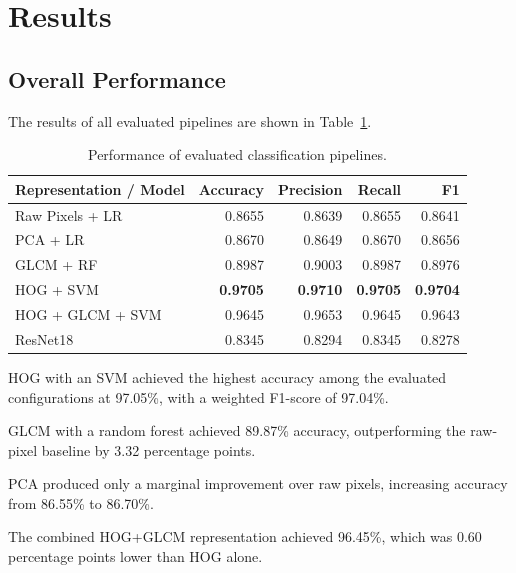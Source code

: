 \documentclass[11pt,a4paper]{article}
\begin{document}

\section{Results}

\subsection{Overall Performance}

The results of all evaluated pipelines are shown in Table~\ref{tab:results}.

\begin{table}[H]
\centering
\caption{Performance of evaluated classification pipelines.}
\label{tab:results}
\begin{tabular}{lrrrr}
\toprule
\textbf{Representation / Model}
& \textbf{Accuracy}
& \textbf{Precision}
& \textbf{Recall}
& \textbf{F1} \\
\midrule
Raw Pixels + LR
& 0.8655
& 0.8639
& 0.8655
& 0.8641 \\

PCA + LR
& 0.8670
& 0.8649
& 0.8670
& 0.8656 \\

GLCM + RF
& 0.8987
& 0.9003
& 0.8987
& 0.8976 \\

HOG + SVM
& \textbf{0.9705}
& \textbf{0.9710}
& \textbf{0.9705}
& \textbf{0.9704} \\

HOG + GLCM + SVM
& 0.9645
& 0.9653
& 0.9645
& 0.9643 \\

ResNet18
& 0.8345
& 0.8294
& 0.8345
& 0.8278 \\

\bottomrule
\end{tabular}
\end{table}

HOG with an SVM achieved the highest accuracy among the evaluated configurations at 97.05\%, with a weighted F1-score of 97.04\%.

GLCM with a random forest achieved 89.87\% accuracy, outperforming the raw-pixel baseline by 3.32 percentage points.

PCA produced only a marginal improvement over raw pixels, increasing accuracy from 86.55\% to 86.70\%.

The combined HOG+GLCM representation achieved 96.45\%, which was 0.60 percentage points lower than HOG alone.
\end{document}

